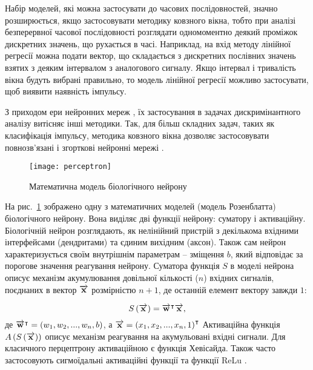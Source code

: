 
Набір моделей, які можна застосувати до часових послідовностей, значно 
розширюється, якщо застосовувати методику ковзного вікна, тобто при аналізі 
безперервної часової послідовності розглядати одномоментно деякий проміжок 
дискретних значень, що рухається в часі. Наприклад, на вхід методу лінійної 
регресії \cite{imp:Xin2009} можна подати вектор, що складається з дискретних 
послівних значень взятих з деяким інтервалом з аналогового сигналу. Якщо 
інтервал і тривалість вікна будуть вибрані правильно, то модель лінійної
регресії можливо застосувати, щоб виявити наявність імпульсу. 

З приходом ери нейронних мереж \cite{imp:Rosenblatt1957}, їх застосування в
задачах дискримінантного аналізу витісняє інші методики. Так, для більш 
складних задач, таких як класифікація імпульсу, методика ковзного вікна 
дозволяє застосовувати повнозв'язані і згорткові нейронні мережі 
\cite{imp:Plakhtii2019}.

\begin{figure}[htbp] \begin{center}
\texttt{[image: perceptron]}
\caption{Математична модель біологічного нейрону}
\label{fig:perceptron}
\end{center} \end{figure}

На рис.~\ref{fig:perceptron} зображено одну з математичних моделей (модель 
Розенблатта) біологічного нейрону. Вона виділяє дві функції нейрону: суматору 
і активаційну. Біологічній нейрон розглядають, як нелінійний пристрій з 
декількома вхідними інтерфейсами (дендритами) та єдиним вихідним (аксон).
Також сам нейрон характеризується своїм внутрішнім параметрам -- зміщення 
$ b $, який відповідає за порогове значення реагування нейрону. Суматора 
функція $ S $ в моделі нейрона описує механізм акумулювання довільної 
кількості ($ n $) вхідних сигналів, поєднаних в вектор $ \overrightarrow{\mathbf x} $ 
розмірністю $ n + 1 $, де останній елемент вектору завжди $ 1 $:

\begin{equation}
S \left( \overrightarrow{\mathbf x} \right) = \overrightarrow{\mathbf w}^\intercal \overrightarrow{\mathbf x},
\end{equation}
%
де $ \overrightarrow{\mathbf w}^\intercal = \left( w_1, w_2, ..., w_n, b \right) $, а
$ \overrightarrow{\mathbf x} = \left( x_1, x_2, ..., x_n, 1 \right)^\intercal $
Активаційна функція $ A \left( S \left( \overrightarrow{\mathbf x} \right) \right) $ описує механізм 
реагування на акумульовані вхідні сигнали. Для класичного перцептрону 
активаційною є функція Хевісайда. Також часто застосовують сигмоїдальні 
активаційні функції та функції ReLu \cite{imp:Kussul2004}.

